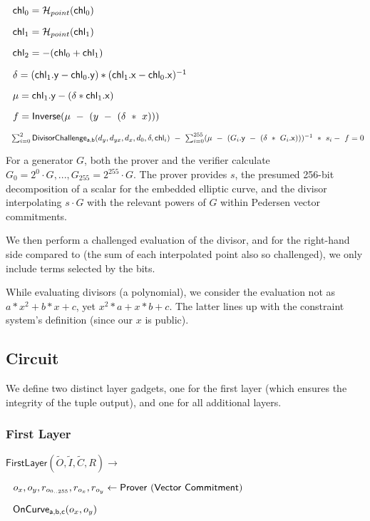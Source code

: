 \documentclass[]{article}
\begin{document}
$~~\mathsf{chl}_0 = \mathcal{H}_{point}(\mathsf{chl}_0)$

$~~\mathsf{chl}_1 = \mathcal{H}_{point}(\mathsf{chl}_1)$

$~~\mathsf{chl}_2 = -(\mathsf{chl}_0 + \mathsf{chl}_1)$

$~~\delta = (\mathsf{chl}_1\mathsf{.y} - \mathsf{chl}_0\mathsf{.y}) * (\mathsf{chl}_1\mathsf{.x} - \mathsf{chl}_0\mathsf{.x})^{-1}$

$~~\mu = \mathsf{chl}_1\mathsf{.y} - (\delta * \mathsf{chl}_1\mathsf{.x})$

$~~f = \mathsf{Inverse}(\mu ~-~ (y ~-~ (\delta ~*~ x)))$

$~~\sum^2_{i=0} \mathsf{DivisorChallenge_{a,b}}(d_y, d_{yx}, d_x, d_0, \delta, \mathsf{chl}_i) ~-~ \sum^{255}_{i=0} (\mu ~-~ (G_i\mathsf{.y} ~-~ (\delta ~*~ G_i\mathsf{.x})))^{-1} ~*~ s_i - ~f= 0$

For a generator $G$, both the prover and the verifier calculate $G_0 = 2^0 \cdot G, ..., G_{255} = 2^{255} \cdot G$. The prover provides $s$, the presumed 256-bit decomposition of a scalar for the embedded elliptic curve, and the divisor interpolating $s \cdot G$ with the relevant powers of $G$ within Pedersen vector commitments.

We then perform a challenged evaluation of the divisor, and for the right-hand side compared to (the sum of each interpolated point also so challenged), we only include terms selected by the bits.

While evaluating divisors (a polynomial), we consider the evaluation not as $a * x^2 + b * x + c$, yet $x^2 * a + x * b + c$. The latter lines up with the constraint system's definition (since our $x$ is public).

\newpage

\subsection{Circuit}

We define two distinct layer gadgets, one for the first layer (which ensures the integrity of the tuple output), and one for all additional layers.

\subsubsection{First Layer}

$\mathsf{FirstLayer}(\tilde{O}, \tilde{I}, \tilde{C}, R) \rightarrow$

$~~o_x, o_y, r_{o_{0..255}}, r_{o_x}, r_{o_y}\leftarrow \mathsf{Prover ~(Vector ~Commitment)}$

$~~\mathsf{OnCurve_{a,b,c}}(o_x, o_y)$
\end{document}

